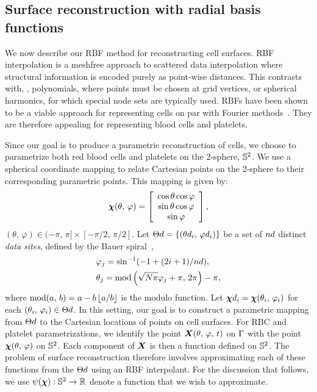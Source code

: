 \subsection{Surface reconstruction with radial basis functions}\label{sec:rbf-interpolation}

We now describe our RBF method for reconstructing cell surfaces. RBF interpolation is a meshfree approach to scattered data interpolation
where structural information is encoded purely as point-wise distances. This
contrasts with, , polynomials, where points must be chosen at grid vertices, or spherical harmonics, for which special node sets are typically used. RBFs have been shown to be a viable approach for representing cells on par with Fourier methods~\cite{Shankar:2013ki}. They are therefore appealing for representing blood cells and platelets. 

Since our goal is to produce a parametric reconstruction of cells, we choose to parametrize both red blood cells and platelets on the 2-sphere, $\mathbb{S}^2$. We use a spherical coordinate mapping to relate Cartesian points on the 2-sphere to their corresponding parametric points. This mapping is given by:
\begin{equation}
    \boldsymbol{\chi}(\theta,\,\varphi) =
    \left[\begin{array}{c}
        \cos\theta\cos\varphi \\
        \sin\theta\cos\varphi \\
        \sin\varphi
    \end{array}\right],
\end{equation}
$(\theta,\,\varphi)\in(-\pi,\,\pi]\times[-\pi/2,\,\pi/2]$.
Let $\data\sites = \{(\data\theta_i,\,\data\varphi_i)\}$ be a set of $\data\cardinality$
distinct \emph{data sites}, defined by the Bauer spiral~\cite{Bauer:2000km},
\begin{equation}\label{eq:bauer-spiral}
    \begin{aligned}
        &\varphi_j = \sin^{-1}(-1 + (2i + 1) / \data\cardinality), \\
        &\theta_j = \modulo\left(\sqrt{N\pi}\varphi_j + \pi,\,2\pi\right) - \pi,
    \end{aligned}
\end{equation}
where $\operatorname{mod}(a,\,b) = a - b\left\lfloor{a/b}\right\rfloor$ is the modulo function. Let $\data\Xp_i = \Xp(\theta_i,\,\varphi_i)$ for each $(\theta_i,\,\varphi_i) \in \data\sites$. In this setting, our goal is to construct a parametric mapping from $\data\sites$ to the Cartesian locations of points on cell surfaces. For RBC and platelet parametrizations, we identify the point $\boldsymbol{X}(\theta,\,\varphi,\,t)$
on $\Gamma$ with the point $\boldsymbol{\chi}(\theta,\,\varphi)$ on $\mathbb{S}^2$. Each component of
$\boldsymbol{X}$ is then a function defined on $\mathbb{S}^2$. The problem of surface reconstruction therefore involves approximating each of these functions from the $\data\sites$ using an RBF interpolant. For the discussion that follows, we use $\psi(\boldsymbol{\chi}) : \mathbb{S}^2 \to \mathbb{R}$ denote a function that we wish to approximate.


